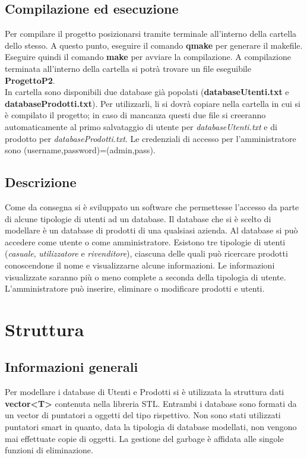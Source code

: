 \documentclass[a4paper,10pt] {article}
\begin{document}
\subsection{Compilazione ed esecuzione}
Per compilare il progetto posizionarsi tramite terminale all'interno della cartella dello stesso. A questo punto, eseguire il comando \textbf{qmake} per generare
il makefile. Eseguire quindi il comando \textbf{make} per avviare la compilazione. A compilazione terminata all'interno della cartella si potrà trovare un file 
eseguibile \textbf{ProgettoP2}.\\
In cartella sono disponibili due database già popolati (\textbf{databaseUtenti.txt} e \textbf{databaseProdotti.txt}). Per utilizzarli, li si dovrà copiare nella cartella in cui si è compilato il progetto; in caso di mancanza questi due file si creeranno automaticamente al primo salvataggio di utente per \textsl{databaseUtenti.txt} e di prodotto per \textsl{databaseProdotti.txt}.
Le credenziali di accesso per l'amministratore sono (username,password)=(admin,pass).

\subsection{Descrizione}
Come da consegna si è sviluppato un software che permettesse l'accesso da parte di alcune tipologie di utenti ad un database. Il database che si è scelto di 
modellare è un database di prodotti di una qualsiasi azienda. Al database si può accedere come utente o come amministratore. Esistono tre tipologie di utenti (\textsl{casuale}, \textsl{utilizzatore} e \textsl{rivenditore}),
ciascuna delle quali può
ricercare prodotti conoscendone il nome e visualizzarne alcune informazioni. Le informazioni visualizzate saranno più o meno complete a seconda della tipologia
di utente. L'amministratore può inserire, eliminare o modificare prodotti e utenti.

\newpage

\section{Struttura}

\subsection{Informazioni generali}
Per modellare i database di Utenti e Prodotti si è utilizzata la struttura dati \textbf{vector<T>} contenuta nella libreria STL. Entrambi i database sono formati
da un vector di puntatori a oggetti del tipo rispettivo. Non sono stati utilizzati puntatori smart in quanto, data la tipologia di database modellati, non vengono
mai effettuate copie di oggetti. La gestione del garbage è affidata alle singole funzioni di eliminazione.
\end{document}
